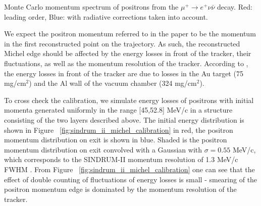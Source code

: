  {
  \label{fig:mu2e_5645_fig_001_mue3_decay}
  Monte Carlo momentum spectrum of positrons from the $\mu^+ \rightarrow e^+ \nu \bar{\nu}$
  decay. Red: leading order, Blue: with radiative corrections taken into account.
}
\vspace{0.1in}

We expect the positron momentum referred to in the paper
to be the momentum in the first reconstructed point on the trajectory. As such, the
reconstructed Michel edge should be affected by the energy losses in front of the
tracker, their fluctuations, as well as the momentum resolution of the tracker.
According to \cite{sindrum_ii:Bertl2006}, the energy losses in front of the tracker are due to 
losses in the Au target (75 mg/cm$^2$) and the Al wall of the vacuum chamber (324 mg/cm$^2$).

To cross check the calibration, we simulate energy losses of positrons with initial
momenta generated uniformly in the range [45,52.8] MeV/c in a structure consisting
of the two layers described above. The initial energy distribution is shown
in Figure ~\ref{fig:sindrum_ii_michel_calibration}
in red, the positron momentum distribution on exit is shown in blue.
Shaded is the positron momentum distribution on exit convolved with
a Gaussian with $\sigma = 0.55$ MeV/c, which corresponds to the SINDRUM-II
momentum resolution of 1.3 MeV/c FWHM \cite{sindrum_ii:Kaulard1997_Thesis}.
From Figure ~\ref{fig:sindrum_ii_michel_calibration} one can see that the effect 
of double counting of fluctuations of energy losses is small - smearing of the
positron momentum edge is dominated by the momentum resolution of the tracker.

